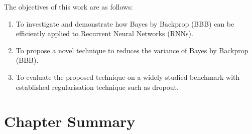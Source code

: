 The objectives of this work are as follows:
\begin{enumerate}
	\item To investigate and demonstrate how Bayes by Backprop (BBB) can be efficiently applied to Recurrent Neural Networks (RNNs).
	\item To propose a novel technique to reduces the variance of Bayes by Backprop (BBB).
	\item To evaluate the proposed technique on a widely studied benchmark with established regularisation technique such as dropout.
\end{enumerate}

\section{Chapter Summary}

